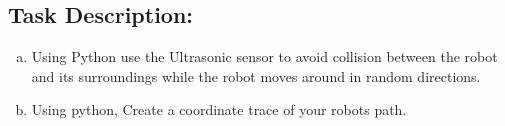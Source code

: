 

\subsection*{\Large Task Description:}
     \begin{enumerate}[a)]
     
     
        \item Using Python use the Ultrasonic sensor to avoid collision between the robot and its surroundings while the robot moves around in random directions. 
     
        \item  Using python, Create a coordinate trace of your robots path. 
        
    \end{enumerate}